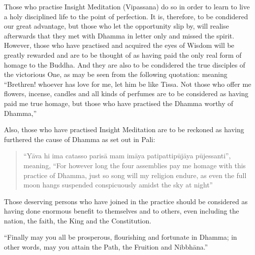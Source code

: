 \documentclass[a5paper,10pt,english]{book}
\begin{document}
\sphinxAtStartPar
Those who practise Insight Meditation (Vipassana) do so in order to learn to live a holy disciplined life to the point of perfection. It is, therefore, to be condidered our great advantage, but those who let the opportunity slip by, will realise afterwards that they met with Dhamma in letter only and missed the spirit. However, those who have practised and acquired the eyes of Wisdom will be greatly rewarded and are to be thought of as having paid the only real form of homage to the Buddha. And they are also to be condidered the true disciples of the victorious One, as may be seen from the following quotation:  meaning “Brethren! whoever has love for me, let him be like Tissa. Not those who offer me flowers, incense, candles and all kinds of perfumes are to be considered as having paid me true homage, but those who have practised the Dhamma worthy of Dhamma,”

\sphinxAtStartPar
Also, those who have practised Insight Meditation are to be reckoned as having furthered the cause of Dhamma as set out in Pali:
\begin{quote}

\sphinxAtStartPar
“Yāva hi ima catasso parisā mam imāya patipatti\sphinxhyphen{}pūjāya pūjessanti”, meaning, “For however long the four assemblies pay me homage with this practice of Dhamma, just so song will my religion endure, as even the full moon hangs suspended conspicuously amidst the sky at night”
\end{quote}

\sphinxAtStartPar
Those deserving persons who have joined in the practice should be considered as having done enormous benefit to themselves and to others, even including the nation, the faith, the King and the Constitution.

\sphinxAtStartPar
{} “Finally may you all be prosperous, flourishing and fortunate in Dhamma; in other words, may you attain the Path, the Fruition and Nibbhāna.”
\end{document}
